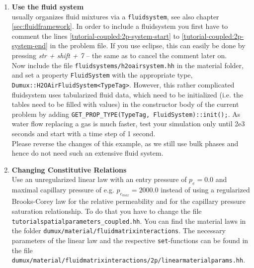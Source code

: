 \begin{enumerate}
\item \textbf{Use the \Dumux fluid system} \\
\Dumux usually organizes fluid mixtures via a \texttt{fluidsystem}, see also chapter \ref{sec:fluidframework}. In order to include a fluidsystem you first have to comment the lines \ref{tutorial-coupled:2p-system-start} to \ref{tutorial-coupled:2p-system-end} in the problem file. If you use eclipse, this can easily be done by pressing \textit{str + shift + 7} -- the same as to cancel the comment later on.\\
Now include the file \texttt{fluidsystems/h2oairsystem.hh} in the material folder, and set a property \texttt{FluidSystem} with the appropriate type, \texttt{Dumux::H2OAirFluidSystem<TypeTag>}. However, this rather complicated fluidsystem uses tabularized fluid data, which need to be initialized (i.e. the tables need to be filled with values) in the constructor body of the current problem by adding \texttt{GET\_PROP\_TYPE(TypeTag, FluidSystem)::init();}. As water flow replacing a gas is much faster, test your simulation only until 2e3 seconds and start with a time step of 1 second.\\
Please reverse the changes of this example, as we still use bulk phases and hence do not need such an extensive fluid system.

\item \textbf{Changing Constitutive Relations} \\
  Use an unregularized linear law with an entry pressure of $p_e = 0.0$ and maximal capillary pressure of e.g. $p_{c_{max}} = 2000.0$ instead of using a
 regularized Brooks-Corey law for the
  relative permeability and for the capillary pressure saturation relationship. To do that you have
  to change the file \texttt{tutorialspatialparameters\_coupled.hh}. 
 You can find the material laws in the folder 
  \verb+dumux/material/fluidmatrixinteractions+. The necessary parameters
of the linear law and the respective \texttt{set}-functions can be found
 in the file \\
 \verb+dumux/material/fluidmatrixinteractions/2p/linearmaterialparams.hh+.
 

\end{enumerate}

